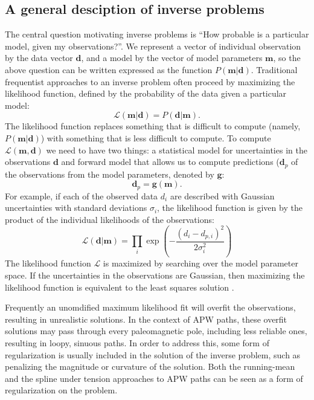 \documentclass[preprint,12pt,authoryear]{elsarticle}
\begin{document}
\subsection{A general desciption of inverse problems}
\label{sec:intro_inverse_problems}
The central question motivating inverse problems is ``How probable is a particular model, given my observations?''.
We represent a vector of individual observation by the data vector $\mathbf{d}$, and a model
by the vector of model parameters $\mathbf{m}$, so the above question can be written expressed as the function $P(\mathbf{m} \vert \mathbf{d})$.
Traditional frequentist approaches to an inverse problem often proceed by maximizing the likelihood function,
defined by the probability of the data given a particular model:
\begin{equation}
\mathcal{L} ( \mathbf{m} \vert \mathbf{d} ) = P( \mathbf{d} \vert \mathbf{m} ).
\label{eq:likelihood}
\end{equation}
The likelihood function replaces something that is difficult to compute (namely, $P(\mathbf{m} \vert \mathbf{d})$)
with something that is less difficult to compute. 
To compute $\mathcal{L}(\mathbf{m}, \mathbf{d})$ we need to have two things: a statistical model for 
uncertainties in the observations $\mathbf{d}$ and forward model that allows us to compute
predictions ($\mathbf{d}_p$ of the observations from the model parameters, denoted by $\mathbf{g}$:
\begin{equation}
\mathbf{d}_p = \mathbf{g}(\mathbf{m}).
\label{eq:forward}
\end{equation}
For example, if each of the observed data $d_i$ are described with Gaussian uncertainties
with standard deviations $\sigma_i$, the likelihood function is given by the product
of the individual likelihoods of the observations:
\begin{equation}
\mathcal{L}(\mathbf{d} | \mathbf{m} ) = \displaystyle\prod_i \exp\left({-\frac{(d_i - d_{p,i})^2}{2 \sigma_i^2}}\right)
\label{eq:example_likelihood}
\end{equation}
The likelihood function $\mathcal{L}$ is maximized by searching over the model parameter space.
If the uncertainties in the observations are Gaussian, then maximizing the likelihood function is
equivalent to the least squares solution \citep{aster2005parameter}.

Frequently an unomdified maximum likelihood fit will overfit the observations, resulting
in unrealistic solutions. In the context of APW paths, these overfit solutions may
pass through every paleomagnetic pole, including less reliable ones, resulting in
loopy, sinuous paths. In order to address this, some form of regularization is usually
included in the solution of the inverse problem, such as penalizing the magnitude or
curvature of the solution. Both the running-mean and the spline under tension approaches
to APW paths can be seen as a form of regularization on the problem.
\end{document}
